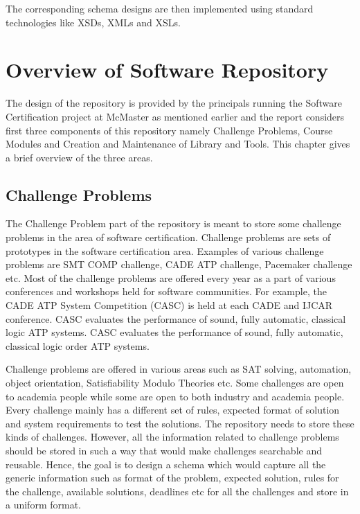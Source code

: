 \documentclass[11pt,letterpaper]{report}
\begin{document}
The corresponding schema designs are then implemented using standard technologies like XSDs, XMLs and XSLs.

\chapter{Overview of Software Repository}
 The design of the repository is provided by the principals running the Software Certification project at McMaster as mentioned earlier and the report considers first three components of this repository namely Challenge Problems, Course Modules and Creation and Maintenance of Library and Tools. This chapter gives a brief overview of the three areas.

 \section{Challenge Problems}
 The Challenge Problem part of the repository is meant to store some challenge problems in the area of software certification. Challenge problems are sets of prototypes in the software certification area. Examples of various challenge problems are SMT COMP challenge, CADE ATP challenge, Pacemaker challenge etc. Most of the challenge problems are offered every year as a part of various conferences and workshops held for software communities. For example, the CADE ATP System Competition (CASC) is held at each CADE and IJCAR conference. CASC evaluates the performance of sound, fully automatic, classical logic ATP systems. CASC evaluates the performance of sound, fully automatic, classical logic order ATP systems. 
 
 Challenge problems are offered in various areas such as SAT solving, automation, object orientation, Satisfiability Modulo Theories etc. Some challenges are open to academia people while some are open to both industry and academia people. Every challenge mainly has a different set of rules, expected format of solution and system requirements to test the solutions. The repository needs to store these kinds of challenges. However, all the information related to challenge problems should be stored in such a way that would make challenges searchable and reusable. Hence, the goal is to design a schema which would capture all the generic information such as format of the problem, expected solution, rules for the challenge, available solutions, deadlines etc for all the challenges and store in a uniform format.
\end{document}
